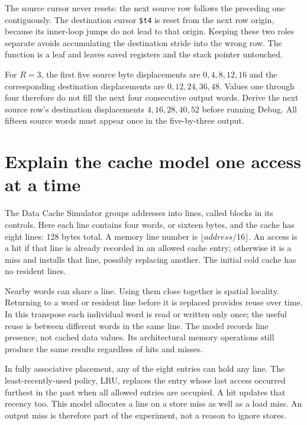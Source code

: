 The source cursor never resets: the next source row follows the preceding one
contiguously. The destination cursor \texttt{\$t4} is reset from the next row
origin, because its inner-loop jumps do not lead to that origin. Keeping these
two roles separate avoids accumulating the destination stride into the wrong row.
The function is a leaf and leaves saved registers and the stack pointer untouched.

For $R=3$, the first five source byte displacements are $0,4,8,12,16$ and the
corresponding destination displacements are $0,12,24,36,48$. Values one through
four therefore do not fill the next four consecutive output words. Derive the
next source row's destination displacements $4,16,28,40,52$ before running Debug.
All fifteen source words must appear once in the five-by-three output.

\section{Explain the cache model one access at a time}

The Data Cache Simulator groups addresses into lines, called blocks in its
controls. Here each line contains four words, or sixteen bytes, and the cache
has eight lines: 128 bytes total. A memory line number is $\lfloor address/16\rfloor$.
An access is a hit if that line is already recorded in an allowed cache entry;
otherwise it is a miss and installs that line, possibly replacing another.
The initial cold cache has no resident lines.

Nearby words can share a line. Using them close together is spatial locality.
Returning to a word or resident line before it is replaced provides reuse over
time. In this transpose each individual word is read or written only once;
the useful reuse is between different words in the same line. The model records
line presence, not cached data values. Its architectural memory operations still
produce the same results regardless of hits and misses.

In fully associative placement, any of the eight entries can hold any line.
The least-recently-used policy, LRU, replaces the entry whose last access occurred
furthest in the past when all allowed entries are occupied. A hit updates that
recency too. This model allocates a line on a store miss as well as a load miss.
An output miss is therefore part of the experiment, not a reason to ignore stores.



